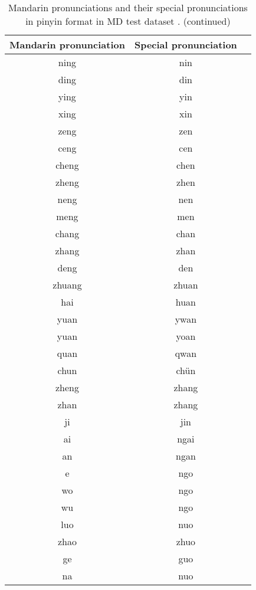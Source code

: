 \begin{table}[H]
\ContinuedFloat
\centering
\begin{tabular}{ccc}
\toprule
Mandarin pronunciation & Special pronunciation \\
\midrule
ning              &              nin  \\
ding              &              din  \\
ying              &              yin  \\
xing              &              xin  \\
zeng              &              zen  \\
ceng              &              cen  \\
cheng             &              chen \\
zheng             &              zhen \\
neng              &              nen  \\
meng              &              men  \\
chang             &              chan \\
zhang             &              zhan \\
deng              &              den  \\
zhuang            &              zhuan \\
hai               &              huan \\
yuan              &              ywan \\
yuan              &              yoan \\
quan              &              qwan \\
chun              &              ch\"{u}n \\
zheng             &              zhang \\
zhan              &              zhang \\
ji                &              jin  \\
ai                &              ngai \\
an                &              ngan \\
e              	  &              ngo  \\
wo                &              ngo  \\
wu                &              ngo  \\
luo               &              nuo  \\
zhao              &              zhuo \\
ge                &              guo  \\
na                &              nuo  \\
\bottomrule
\end{tabular}
\caption{Mandarin pronunciations and their special pronunciations in pinyin format in MD test dataset . (continued)}
\label{tab:app:special_pronun_cout}
\end{table}


